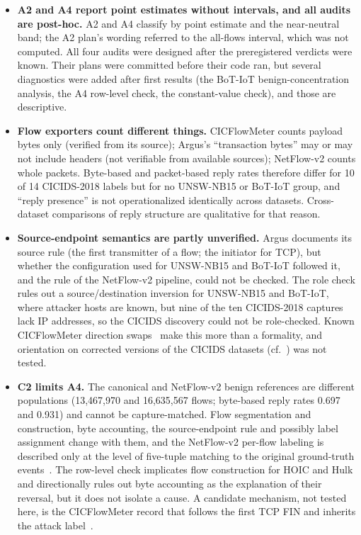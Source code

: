 \documentclass[preprint,12pt]{elsarticle}
\begin{document}
\begin{itemize}
\item \textbf{A2 and A4 report point estimates without intervals, and all audits are post-hoc.} A2 and A4 classify by point estimate and the near-neutral band; the A2 plan's wording referred to the all-flows interval, which was not computed. All four audits were designed after the preregistered verdicts were known. Their plans were committed before their code ran, but several diagnostics were added after first results (the BoT-IoT benign-concentration analysis, the A4 row-level check, the constant-value check), and those are descriptive.
\item \textbf{Flow exporters count different things.} CICFlowMeter counts payload bytes only (verified from its source); Argus's ``transaction bytes'' may or may not include headers (not verifiable from available sources); NetFlow-v2 counts whole packets. Byte-based and packet-based reply rates therefore differ for 10 of 14 CICIDS-2018 labels but for no UNSW-NB15 or BoT-IoT group, and ``reply presence'' is not operationalized identically across datasets. Cross-dataset comparisons of reply structure are qualitative for that reason.
\item \textbf{Source-endpoint semantics are partly unverified.} Argus documents its source rule (the first transmitter of a flow; the initiator for TCP), but whether the configuration used for UNSW-NB15 and BoT-IoT followed it, and the rule of the NetFlow-v2 pipeline, could not be checked. The role check rules out a source/destination inversion for UNSW-NB15 and BoT-IoT, where attacker hosts are known, but nine of the ten CICIDS-2018 captures lack IP addresses, so the CICIDS discovery could not be role-checked. Known CICFlowMeter direction swaps~\cite{engelen2021troubleshooting} make this more than a formality, and orientation on corrected versions of the CICIDS datasets (cf.~\cite{liu2022errorprevalence}) was not tested.
\item \textbf{C2 limits A4.} The canonical and NetFlow-v2 benign references are different populations (13{,}467{,}970 and 16{,}635{,}567 flows; byte-based reply rates 0.697 and 0.931) and cannot be capture-matched. Flow segmentation and construction, byte accounting, the source-endpoint rule and possibly label assignment change with them, and the NetFlow-v2 per-flow labeling is described only at the level of five-tuple matching to the original ground-truth events~\cite{sarhan2021nfv2}. The row-level check implicates flow construction for HOIC and Hulk and directionally rules out byte accounting as the explanation of their reversal, but it does not isolate a cause. A candidate mechanism, not tested here, is the CICFlowMeter record that follows the first TCP FIN and inherits the attack label~\cite{engelen2021troubleshooting,rosay2022cicflowmeter}.

\end{itemize}
\end{document}
